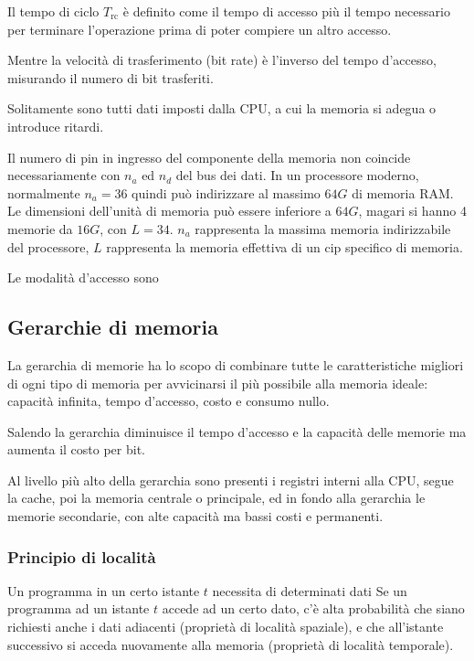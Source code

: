 \documentclass[../template]{subfiles}
\begin{document}
\begin{itemize}
        Il tempo di ciclo $T_\text{rc}$ è definito come il tempo di accesso più il tempo necessario per terminare l'operazione prima di poter compiere un altro accesso.

        Mentre la velocità di trasferimento (bit rate) è l'inverso del tempo d'accesso, misurando il numero di bit trasferiti.

        Solitamente sono tutti dati imposti dalla CPU, a cui la memoria si adegua o introduce ritardi.

\end{itemize}

Il numero di pin in ingresso del componente della memoria non coincide necessariamente con $n_a$ ed $n_d$ del bus dei dati.
In un processore moderno, normalmente $n_a = 36$ quindi può indirizzare al massimo $64G$ di memoria RAM. Le dimensioni dell'unità di memoria può essere inferiore a $64G$, magari si hanno 4 memorie da $16G$, con $L=34$. $n_a$ rappresenta la massima memoria indirizzabile del processore, $L$ rappresenta la memoria effettiva di un cip specifico di memoria.

Le modalità d'accesso sono


\subsection{Gerarchie di memoria}
La gerarchia di memorie ha lo scopo di combinare tutte le caratteristiche migliori di ogni tipo di memoria per avvicinarsi il più possibile alla memoria ideale: capacità infinita, tempo d'accesso, costo e consumo nullo.

Salendo la gerarchia diminuisce il tempo d'accesso e la capacità delle memorie ma aumenta il costo per bit.

Al livello più alto della gerarchia sono presenti i registri interni alla CPU, segue la cache, poi la memoria centrale o principale, ed in fondo alla gerarchia le memorie secondarie, con alte capacità ma bassi costi e permanenti.
\subsubsection{Principio di località}

Un programma in un certo istante $t$ necessita di determinati dati
Se un programma ad un istante $t$ accede ad un certo dato,
c'è alta probabilità che siano richiesti anche i dati adiacenti (proprietà di località spaziale), e che all'istante successivo si acceda nuovamente alla memoria (proprietà di località temporale).
\end{document}
